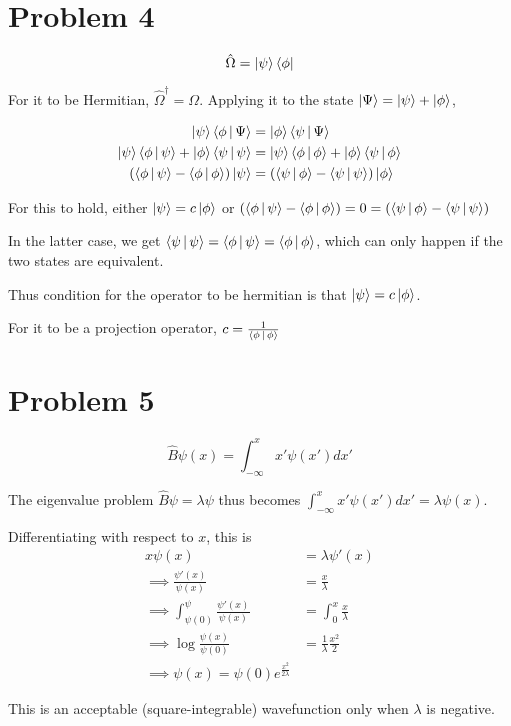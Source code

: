 \documentclass[12pt]{article}
\begin{document}
\section*{Problem 4}

$$\hat \Omega = \Ket{\psi}\Bra{\phi}$$

For it to be Hermitian, $\hat \Omega^\dagger =\Omega$. Applying it to the state $\Ket{\Psi}=\Ket{\psi}+\Ket{\phi}$,

\begin{align*}
\Ket{\psi}\Braket{\phi|\Psi}&=\Ket{\phi}\Braket{\psi|\Psi}\\
\Ket{\psi}\Braket{\phi|\psi}+\Ket{\phi}\Braket{\psi|\psi} &= \Ket{\psi}\Braket{\phi|\phi}+\Ket{\phi}\Braket{\psi|\phi}\\
\left(\Braket{\phi|\psi}-\Braket{\phi|\phi}\right)\Ket{\psi} &= \left(\Braket{\psi|\phi}-\Braket{\psi|\psi}\right)\Ket{\phi}
\end{align*}

For this to hold, either $\Ket{\psi}=c\ket{\phi}$ or  $\left(\Braket{\phi|\psi}-\Braket{\phi|\phi}\right)=0=\left(\Braket{\psi|\phi}-\Braket{\psi|\psi}\right)$

In the latter case, we get $\Braket{\psi|\psi}=\Braket{\phi|\psi}=\Braket{\phi|\phi}$, which can only happen if the two states are equivalent.

Thus condition for the operator to be hermitian is that $\Ket{\psi}=c\Ket{\phi}$.

For it to be a projection operator, $c=\frac1{\Braket{\phi|\phi}}$

\section{Problem 5}

$$\hat B \psi(x)=\int_{-\infty}^x x' \psi(x')dx'$$

The eigenvalue problem $\hat B \psi =\lambda\psi$ thus becomes $\int_{-\infty}^x x' \psi(x')dx' = \lambda \psi(x)$.

Differentiating with respect to $x$, this is \begin{align*}
x\psi(x)&=\lambda\psi'(x)\\
\implies \frac{\psi'(x)}{\psi(x)}&=\frac{x}{\lambda}\\
\implies \int_{\psi(0)}^\psi\frac{\psi'(x)}{\psi(x)}&=\int_0^x\frac{x}{\lambda}\\
\implies \log\frac{\psi(x)}{\psi(0)} &= \frac1{\lambda} \frac{x^2}2\\
\implies \psi(x)=\psi(0)e^{\frac{x^2}{2\lambda}}
\end{align*}

This is an acceptable (square-integrable) wavefunction only when $\lambda$ is negative.
\end{document}
